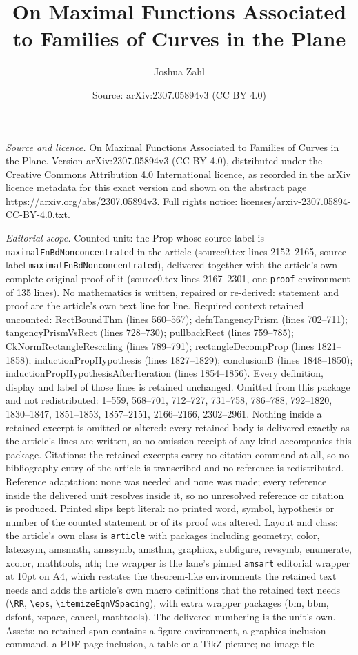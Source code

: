 \documentclass[10pt,a4paper]{amsart}
\title[On Maximal Functions Associated to Families of Curves in the]{On Maximal Functions Associated to Families of Curves in the Plane}
\author{Joshua Zahl}
\date{Source: arXiv:2307.05894v3 (CC BY 4.0)}
\begin{document}
\maketitle

\noindent\emph{Source and licence.} On Maximal Functions Associated to Families of Curves in the Plane. Version arXiv:2307.05894v3 (CC BY 4.0), distributed under the Creative Commons Attribution 4.0 International licence, as recorded in the arXiv licence metadata for this exact version and shown on the abstract page https://arxiv.org/abs/2307.05894v3. Full rights notice: licenses/arxiv-2307.05894-CC-BY-4.0.txt.\par\smallskip

\noindent\textit{Editorial scope.} Counted unit: the Prop whose source label is \texttt{maximalFnBdNonconcentrated} in the article (source0.tex lines 2152--2165, source label \texttt{maximalFnBdNonconcentrated}), delivered together with the article's own complete original proof of it (source0.tex lines 2167--2301, one \texttt{proof} environment of 135 lines). No mathematics is written, repaired or re-derived: statement and proof are the article's own text line for line. Required context retained uncounted: RectBoundThm (lines 560--567); defnTangencyPrism (lines 702--711); tangencyPrismVsRect (lines 728--730); pullbackRect (lines 759--785); CkNormRectangleRescaling (lines 789--791); rectangleDecompProp (lines 1821--1858); inductionPropHypothesis (lines 1827--1829); conclusionB (lines 1848--1850); inductionPropHypothesisAfterIteration (lines 1854--1856). Every definition, display and label of those lines is retained unchanged. Omitted from this package and not redistributed: 1--559, 568--701, 712--727, 731--758, 786--788, 792--1820, 1830--1847, 1851--1853, 1857--2151, 2166--2166, 2302--2961. Nothing inside a retained excerpt is omitted or altered: every retained body is delivered exactly as the article's lines are written, so no omission receipt of any kind accompanies this package. Citations: the retained excerpts carry no citation command at all, so no bibliography entry of the article is transcribed and no reference is redistributed. Reference adaptation: none was needed and none was made; every reference inside the delivered unit resolves inside it, so no unresolved reference or citation is produced. Printed slips kept literal: no printed word, symbol, hypothesis or number of the counted statement or of its proof was altered. Layout and class: the article's own class is \texttt{article} with packages including geometry, color, latexsym, amsmath, amssymb, amsthm, graphicx, subfigure, revsymb, enumerate, xcolor, mathtools, nth; the wrapper is the lane's pinned \texttt{amsart} editorial wrapper at 10pt on A4, which restates the theorem-like environments the retained text needs and adds the article's own macro definitions that the retained text needs (\texttt{\textbackslash RR}, \texttt{\textbackslash eps}, \texttt{\textbackslash itemizeEqnVSpacing}), with extra wrapper packages (bm, bbm, dsfont, xspace, cancel, mathtools). The delivered numbering is the unit's own. Assets: no retained span contains a figure environment, a graphics-inclusion command, a PDF-page inclusion, a table or a TikZ picture; no image file 
\end{document}

